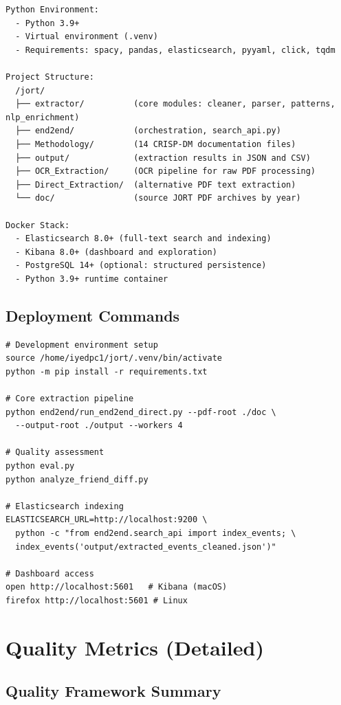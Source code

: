 \documentclass[12pt,a4paper]{report}
\begin{document}
\begin{verbatim}
Python Environment:
  - Python 3.9+
  - Virtual environment (.venv)
  - Requirements: spacy, pandas, elasticsearch, pyyaml, click, tqdm

Project Structure:
  /jort/
  ├── extractor/          (core modules: cleaner, parser, patterns, nlp_enrichment)
  ├── end2end/            (orchestration, search_api.py)
  ├── Methodology/        (14 CRISP-DM documentation files)
  ├── output/             (extraction results in JSON and CSV)
  ├── OCR_Extraction/     (OCR pipeline for raw PDF processing)
  ├── Direct_Extraction/  (alternative PDF text extraction)
  └── doc/                (source JORT PDF archives by year)

Docker Stack:
  - Elasticsearch 8.0+ (full-text search and indexing)
  - Kibana 8.0+ (dashboard and exploration)
  - PostgreSQL 14+ (optional: structured persistence)
  - Python 3.9+ runtime container
\end{verbatim}

\section{Deployment Commands}

\begin{verbatim}
# Development environment setup
source /home/iyedpc1/jort/.venv/bin/activate
python -m pip install -r requirements.txt

# Core extraction pipeline
python end2end/run_end2end_direct.py --pdf-root ./doc \
  --output-root ./output --workers 4

# Quality assessment
python eval.py
python analyze_friend_diff.py

# Elasticsearch indexing
ELASTICSEARCH_URL=http://localhost:9200 \
  python -c "from end2end.search_api import index_events; \
  index_events('output/extracted_events_cleaned.json')"

# Dashboard access
open http://localhost:5601   # Kibana (macOS)
firefox http://localhost:5601 # Linux
\end{verbatim}

\chapter{Quality Metrics (Detailed)}

\section{Quality Framework Summary}
\end{document}
